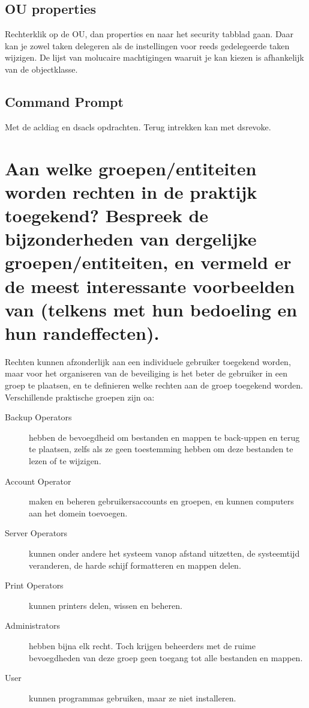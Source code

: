 \subsection{OU properties}

Rechterklik op de OU, dan properties en naar het security tabblad gaan. Daar kan
je zowel taken delegeren als de instellingen voor reeds gedelegeerde taken
wijzigen. De lijst van molucaire machtigingen waaruit je kan kiezen is
afhankelijk van de objectklasse.

\subsection{Command Prompt}

Met de acldiag en dsacls opdrachten. Terug intrekken kan met dsrevoke.

\section{Aan welke groepen/entiteiten worden rechten in de praktijk toegekend?
Bespreek de bijzonderheden van dergelijke groepen/entiteiten, en vermeld er de
meest interessante voorbeelden van (telkens met hun bedoeling en hun
randeffecten).}

Rechten kunnen afzonderlijk aan een individuele gebruiker toegekend worden, maar
voor het organiseren van de beveiliging is het beter de gebruiker in een groep
te plaatsen, en te definieren welke rechten aan de groep toegekend worden.
Verschillende praktische groepen zijn oa:

\begin{description}
	\item[Backup Operators] hebben de bevoegdheid om bestanden en mappen te
		back-uppen en terug te plaatsen, zelfs als ze geen toestemming
		hebben om deze bestanden te lezen of te wijzigen.
	\item[Account Operator] maken en beheren gebruikersaccounts en groepen,
		en kunnen computers aan het domein toevoegen.
	\item[Server Operators] kunnen onder andere het systeem vanop afstand
		uitzetten, de systeemtijd veranderen, de harde schijf
		formatteren en mappen delen.
	\item[Print Operators] kunnen printers delen, wissen en beheren.
	\item[Administrators] hebben bijna elk recht. Toch krijgen beheerders
		met de ruime bevoegdheden van deze groep geen toegang tot alle
		bestanden en mappen.
	\item[User] kunnen programmas gebruiken, maar ze niet installeren.
\end{description}

